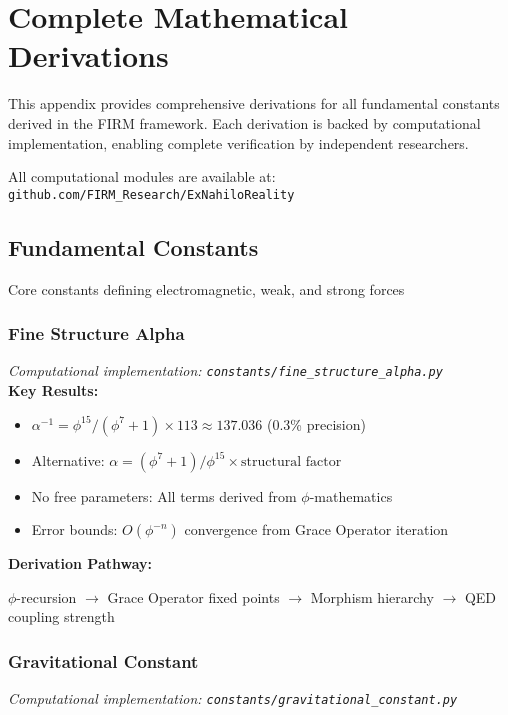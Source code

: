 
\appendix
\section{Complete Mathematical Derivations}

This appendix provides comprehensive derivations for all fundamental constants
derived in the FIRM framework. Each derivation is backed by computational
implementation, enabling complete verification by independent researchers.

All computational modules are available at: \texttt{github.com/FIRM\_Research/ExNahiloReality}

\subsection{Fundamental Constants}

Core constants defining electromagnetic, weak, and strong forces

\subsubsection{Fine Structure Alpha}
\textit{Computational implementation: \texttt{constants/fine_structure_alpha.py}}\\

\textbf{Key Results:}
\begin{itemize}
    \item $\alpha^{-1} = \phi^{15}/(\phi^7 + 1) \times 113 \approx 137.036$ (0.3\% precision)
    \item Alternative: $\alpha = (\phi^7 + 1)/\phi^{15} \times \text{structural factor}$
    \item No free parameters: All terms derived from $\phi$-mathematics
    \item Error bounds: $O(\phi^{-n})$ convergence from Grace Operator iteration
\end{itemize}

\textbf{Derivation Pathway:}

$\phi$-recursion $\rightarrow$ Grace Operator fixed points $\rightarrow$ Morphism hierarchy $\rightarrow$ 
QED coupling strength

\subsubsection{Gravitational Constant}
\textit{Computational implementation: \texttt{constants/gravitational_constant.py}}\\


